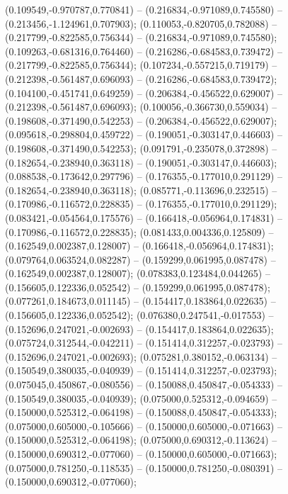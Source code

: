  (0.109549,-0.970787,0.770841) -- (0.216834,-0.971089,0.745580) -- (0.213456,-1.124961,0.707903);
 (0.110053,-0.820705,0.782088) -- (0.217799,-0.822585,0.756344) -- (0.216834,-0.971089,0.745580);
 (0.109263,-0.681316,0.764460) -- (0.216286,-0.684583,0.739472) -- (0.217799,-0.822585,0.756344);
 (0.107234,-0.557215,0.719179) -- (0.212398,-0.561487,0.696093) -- (0.216286,-0.684583,0.739472);
 (0.104100,-0.451741,0.649259) -- (0.206384,-0.456522,0.629007) -- (0.212398,-0.561487,0.696093);
 (0.100056,-0.366730,0.559034) -- (0.198608,-0.371490,0.542253) -- (0.206384,-0.456522,0.629007);
 (0.095618,-0.298804,0.459722) -- (0.190051,-0.303147,0.446603) -- (0.198608,-0.371490,0.542253);
 (0.091791,-0.235078,0.372898) -- (0.182654,-0.238940,0.363118) -- (0.190051,-0.303147,0.446603);
 (0.088538,-0.173642,0.297796) -- (0.176355,-0.177010,0.291129) -- (0.182654,-0.238940,0.363118);
 (0.085771,-0.113696,0.232515) -- (0.170986,-0.116572,0.228835) -- (0.176355,-0.177010,0.291129);
 (0.083421,-0.054564,0.175576) -- (0.166418,-0.056964,0.174831) -- (0.170986,-0.116572,0.228835);
 (0.081433,0.004336,0.125809) -- (0.162549,0.002387,0.128007) -- (0.166418,-0.056964,0.174831);
 (0.079764,0.063524,0.082287) -- (0.159299,0.061995,0.087478) -- (0.162549,0.002387,0.128007);
 (0.078383,0.123484,0.044265) -- (0.156605,0.122336,0.052542) -- (0.159299,0.061995,0.087478);
 (0.077261,0.184673,0.011145) -- (0.154417,0.183864,0.022635) -- (0.156605,0.122336,0.052542);
 (0.076380,0.247541,-0.017553) -- (0.152696,0.247021,-0.002693) -- (0.154417,0.183864,0.022635);
 (0.075724,0.312544,-0.042211) -- (0.151414,0.312257,-0.023793) -- (0.152696,0.247021,-0.002693);
 (0.075281,0.380152,-0.063134) -- (0.150549,0.380035,-0.040939) -- (0.151414,0.312257,-0.023793);
 (0.075045,0.450867,-0.080556) -- (0.150088,0.450847,-0.054333) -- (0.150549,0.380035,-0.040939);
 (0.075000,0.525312,-0.094659) -- (0.150000,0.525312,-0.064198) -- (0.150088,0.450847,-0.054333);
 (0.075000,0.605000,-0.105666) -- (0.150000,0.605000,-0.071663) -- (0.150000,0.525312,-0.064198);
 (0.075000,0.690312,-0.113624) -- (0.150000,0.690312,-0.077060) -- (0.150000,0.605000,-0.071663);
 (0.075000,0.781250,-0.118535) -- (0.150000,0.781250,-0.080391) -- (0.150000,0.690312,-0.077060);
